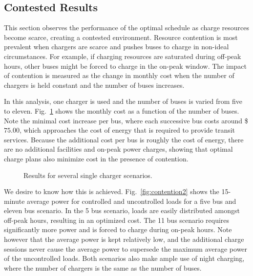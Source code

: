 \subsection{Contested Results}
This section observes the performance of the optimal schedule as charge resources become scarce, creating a contested environment. Resource contention is most prevalent when chargers are scarce and pushes buses to charge in non-ideal circumstances.  For example, if charging resources are saturated during off-peak hours, other buses might be forced to charge in the on-peak window. The impact of contention is measured as the change in monthly cost when the number of chargers is held constant and the number of buses increases. 
\par In this analysis, one charger is used and the number of buses is varied from five to eleven. Fig.~\ref{fig:contention1} shows the monthly cost as a function of the number of buses. Note the minimal cost increase per bus, where each successive bus costs around \$$75.00$, which approaches the cost of energy that is required to provide transit services.  Because the additional cost per bus is roughly the cost of energy, there are no additional facilities and on-peak power charges, showing that optimal charge plans also minimize cost in the presence of contention.
\begin{figure}
	\caption{Results for several single charger scenarios.}
	\label{fig:contention1}
\end{figure}
\par We desire to know how this is achieved. Fig.~\ref{fig:contention2} shows the 15-minute average power for controlled and uncontrolled loads for a five bus and eleven bus scenario. In the 5 bus scenario, loads are easily distributed amongst off-peak hours, resulting in an optimized cost.  The 11 bus scenario requires significantly more power and is forced to charge during on-peak hours.  Note however that the average power is kept relatively low, and the additional charge sessions never cause the average power to supersede the maximum average power of the uncontrolled loads. Both scenarios also make ample use of night charging, where the number of chargers is the same as the number of buses.  
\begin{figure*}
	\centering
	\caption{Comparison of the loads for a 5 and 11 bus scenario with one overhead charger.}
	\label{fig:contention2}
\end{figure*}

